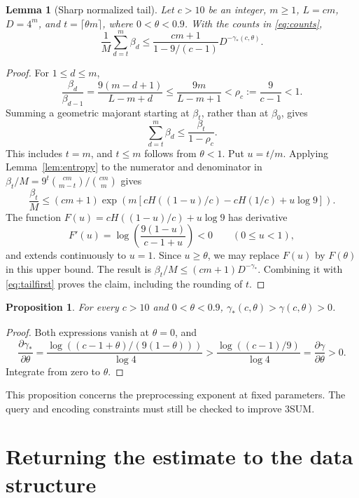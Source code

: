\documentclass[11pt,a4paper]{article}
\newtheorem{lemma}[theorem]{Lemma}
\newtheorem{proposition}[theorem]{Proposition}
\theoremstyle{remark}
\newcommand{\gam}{\gamma_{\!*}}
\begin{document}
\begin{lemma}[Sharp normalized tail]\label{lem:tail}
Let $c>10$ be an integer, $m\geq1$, $L=cm$, $D=4^m$, and
$t=\lceil\theta m\rceil$, where $0<\theta<0.9$. With the counts in
\eqref{eq:counts},
\begin{equation}\label{eq:tailbound}
 \frac1M\sum_{d=t}^m\beta_d
 \leq \frac{cm+1}{1-9/(c-1)}D^{-\gam(c,\theta)}.
\end{equation}
\end{lemma}
\begin{proof}
For $1\leq d\leq m$,
\[
 \frac{\beta_d}{\beta_{d-1}}
 =\frac{9(m-d+1)}{L-m+d}
 \leq\frac{9m}{L-m+1}<\rho_c:=\frac9{c-1}<1.
\]
Summing a geometric majorant starting at $\beta_t$, rather than at
$\beta_0$, gives
\begin{equation}\label{eq:tailfirst}
 \sum_{d=t}^m\beta_d\leq\frac{\beta_t}{1-\rho_c}.
\end{equation}
This includes $t=m$, and $t\leq m$ follows from $\theta<1$.
Put $u=t/m$. Applying Lemma~\ref{lem:entropy} to the numerator and
denominator in
$\beta_t/M=9^t\binom{cm}{m-t}/\binom{cm}m$ gives
\[
 \frac{\beta_t}{M}\leq(cm+1)
 \exp\!\left(m\left[cH((1-u)/c)-cH(1/c)+u\log9\right]\right).
\]
The function $F(u)=cH((1-u)/c)+u\log9$ has derivative
\[
 F'(u)=\log\!\left(\frac{9(1-u)}{c-1+u}\right)<0\qquad(0\leq u<1),
\]
and extends continuously to $u=1$. Since $u\geq\theta$, we may replace
$F(u)$ by $F(\theta)$ in this upper bound. The result is
$\beta_t/M\leq(cm+1)D^{-\gam}$. Combining it with
\eqref{eq:tailfirst} proves the claim, including the rounding of $t$.
\end{proof}

\begin{proposition}\label{prop:strict}
For every $c>10$ and $0<\theta<0.9$, $\gam(c,\theta)>\gamma(c,\theta)>0$.
\end{proposition}
\begin{proof}
Both expressions vanish at $\theta=0$, and
\[
 \frac{\partial\gam}{\partial\theta}
 =\frac{\log((c-1+\theta)/(9(1-\theta)))}{\log4}
 >\frac{\log((c-1)/9)}{\log4}
 =\frac{\partial\gamma}{\partial\theta}>0.
\]
Integrate from zero to $\theta$.
\end{proof}
This proposition concerns the preprocessing exponent at fixed parameters.
The query and encoding constraints must still be checked to improve 3SUM.

\section{Returning the estimate to the data structure}
\end{document}
